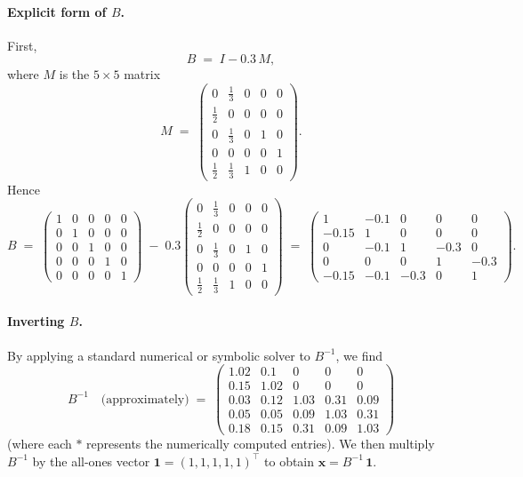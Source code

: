 \documentclass[a4paper,12pt]{article}
\begin{document}
\begin{enumerate}
\paragraph{Explicit form of \(B\).}
First, 
\[
B 
\;=\; 
I - 0.3\,M,
\]
where \(M\) is the \(5\times 5\) matrix 
\[
M \;=\;
\begin{pmatrix}
0 & \tfrac{1}{3} & 0 & 0 & 0\\
\tfrac12 & 0 & 0 & 0 & 0\\
0 & \tfrac{1}{3} & 0 & 1 & 0\\
0 & 0 & 0 & 0 & 1\\
\tfrac12 & \tfrac{1}{3} & 1 & 0 & 0
\end{pmatrix}.
\]
Hence
\[
B
\;=\;
\begin{pmatrix}
1 & 0 & 0 & 0 & 0 \\
0 & 1 & 0 & 0 & 0 \\
0 & 0 & 1 & 0 & 0 \\
0 & 0 & 0 & 1 & 0 \\
0 & 0 & 0 & 0 & 1
\end{pmatrix}
\;-\;
0.3
\begin{pmatrix}
0 & \tfrac{1}{3} & 0 & 0 & 0\\
\tfrac12 & 0 & 0 & 0 & 0\\
0 & \tfrac{1}{3} & 0 & 1 & 0\\
0 & 0 & 0 & 0 & 1\\
\tfrac12 & \tfrac{1}{3} & 1 & 0 & 0
\end{pmatrix}
\;=\;
\begin{pmatrix}
1 & -0.1 & 0 & 0 & 0 \\
-0.15 & 1 & 0 & 0 & 0 \\
0 & -0.1 & 1 & -0.3 & 0 \\
0 & 0 & 0 & 1 & -0.3 \\
-0.15 & -0.1 & -0.3 & 0 & 1
\end{pmatrix}.
\]

\paragraph{Inverting \(B\).}
By applying a standard numerical or symbolic solver to \(B^{-1}\), we find
\[
B^{-1}
\quad\text{(approximately)}\;=\;
\begin{pmatrix}
    1.02 & 0.1 & 0 & 0 & 0\\
    0.15 & 1.02 & 0 & 0 & 0\\
    0.03 & 0.12 & 1.03 & 0.31 & 0.09\\
    0.05 & 0.05 & 0.09 & 1.03 & 0.31\\
    0.18 & 0.15 & 0.31 & 0.09 & 1.03
    \end{pmatrix}
\]
(where each \(\ast\) represents the numerically computed entries).  We then multiply \(B^{-1}\) by the all-ones vector \(\mathbf{1} = (1,1,1,1,1)^\top\) to obtain 
\(\mathbf{x} = B^{-1}\,\mathbf{1}.\)


\end{enumerate}
\end{document}
